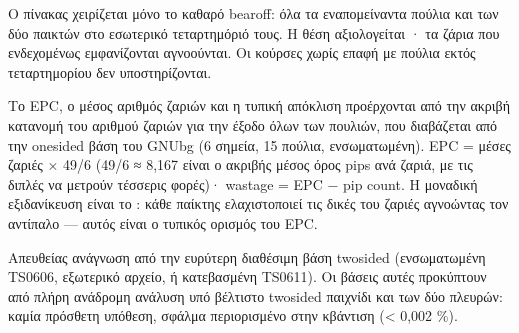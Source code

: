 \documentclass[letterpaper,10pt,greek]{sphinxmanual}
\begin{document}
\sphinxAtStartPar
{} Ο πίνακας χειρίζεται μόνο το καθαρό bearoff: όλα τα εναπομείναντα πούλια και των δύο παικτών στο εσωτερικό τεταρτημόριό τους. Η θέση αξιολογείται · τα ζάρια που ενδεχομένως εμφανίζονται αγνοούνται. Οι κούρσες χωρίς επαφή με πούλια εκτός τεταρτημορίου δεν υποστηρίζονται.

\sphinxAtStartPar
{} Το EPC, ο μέσος αριθμός ζαριών και η τυπική απόκλιση προέρχονται από την ακριβή κατανομή του αριθμού ζαριών για την έξοδο όλων των πουλιών, που διαβάζεται από την one\sphinxhyphen{}sided βάση του GNUbg (6 σημεία, 15 πούλια, ενσωματωμένη). EPC = μέσες ζαριές × 49/6 (49/6 ≈ 8,167 είναι ο ακριβής μέσος όρος pips ανά ζαριά, με τις διπλές να μετρούν τέσσερις φορές)· wastage = EPC − pip count. Η μοναδική εξιδανίκευση είναι το : κάθε παίκτης ελαχιστοποιεί τις δικές του ζαριές αγνοώντας τον αντίπαλο — αυτός είναι ο τυπικός ορισμός του EPC.

\sphinxAtStartPar
{} Απευθείας ανάγνωση από την ευρύτερη διαθέσιμη βάση two\sphinxhyphen{}sided (ενσωματωμένη TS\sphinxhyphen{}06\sphinxhyphen{}06, εξωτερικό αρχείο, ή κατεβασμένη TS\sphinxhyphen{}06\sphinxhyphen{}11). Οι βάσεις αυτές προκύπτουν από πλήρη ανάδρομη ανάλυση υπό βέλτιστο two\sphinxhyphen{}sided παιχνίδι και των δύο πλευρών: καμία πρόσθετη υπόθεση, σφάλμα περιορισμένο στην κβάντιση (< 0,002 \%).
\end{document}
